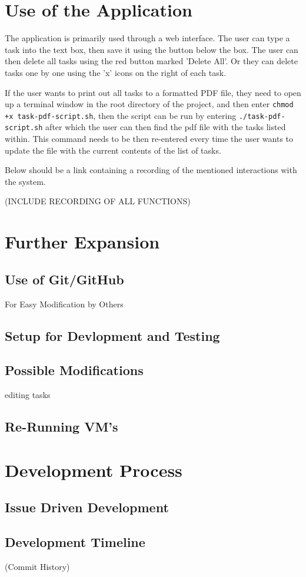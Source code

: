 \documentclass[12pt]{extarticle}
\begin{document}
\section{Use of the Application}
The application is primarily used through a web interface. The user can type a task into the text box, then save it using the button below the box. The user can then delete all tasks using the red button marked 'Delete All'. Or they can delete tasks one by one using the 'x' icons on the right of each task.

If the user wants to print out all tasks to a formatted PDF file, they need to open up a terminal window in the root directory of the project, and then enter  \lstinline|chmod +x task-pdf-script.sh|, then the script can be run by entering \lstinline|./task-pdf-script.sh| after which the user can then find the pdf file with the tasks listed within. This command needs to be then re-entered every time the user wants to update the file with the current contents of the list of tasks.

Below should be a link containing a recording of the mentioned interactions with the system. 

(INCLUDE RECORDING OF ALL FUNCTIONS)

\section{Further Expansion}
\subsection{Use of Git/GitHub}
For Easy Modification by Others
\subsection{Setup for Devlopment and Testing}
\subsection{Possible Modifications}
editing tasks
\subsection{Re-Running VM's}

\section{Development Process}
\subsection{Issue Driven Development}
\subsection{Development Timeline}
(Commit History)
\end{document}
